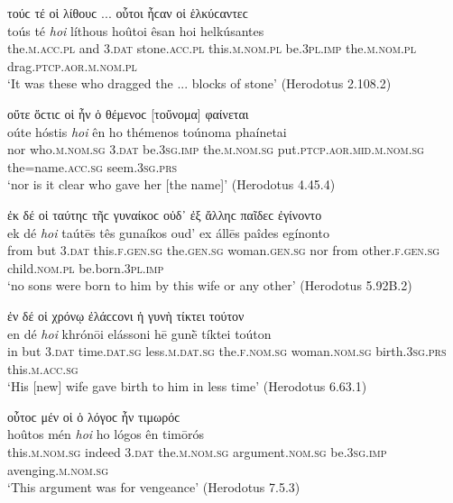 \begin{exe}
\ex τούϲ τέ {οἱ} λίθουϲ ... οὗτοι ἦϲαν οἱ ἑλκύϲαντεϲ\\
\gll toús té \emph{hoi} líthous hoûtoi êsan {hoi} helkúsantes\\
the.\textsc{m.acc.pl} and \textsc{3.dat} stone.\textsc{acc.pl} this.\textsc{m.nom.pl} be.\textsc{3pl.imp} the.\textsc{m.nom.pl} drag.\textsc{ptcp.aor.m.nom.pl}\\
\trans `It was these who dragged the ... blocks of stone' (Herodotus 2.108.2)
\label{oi6}
\end{exe}

\begin{exe}
\ex οὔτε ὅϲτιϲ {οἱ} ἦν ὁ {θέμενοϲ} {[}τοὔνομα{]} φαίνεται\\
\gll oúte hóstis \emph{hoi} ên ho {thémenos} toúnoma phaínetai\\
nor who.\textsc{m.nom.sg} \textsc{3.dat} be.\textsc{3sg.imp} the.\textsc{m.nom.sg} put.\textsc{ptcp.aor.mid.m.nom.sg} the=name.\textsc{acc.sg} seem.\textsc{3sg.prs}\\
\trans `nor is it clear who gave her {[}the name{]}' (Herodotus 4.45.4)
\label{oi7}
\end{exe}

\begin{exe}
\ex ἐκ δέ {οἱ} ταύτηϲ τῆϲ γυναίκοϲ οὐδ᾽ ἐξ ἄλληϲ παῖδεϲ {ἐγίνοντο}\\
\gll ek dé \emph{hoi} taútēs tês gunaíkos oud' ex állēs paîdes {egínonto}\\
from but \textsc{3.dat} this.\textsc{f.gen.sg} the.\textsc{gen.sg} woman.\textsc{gen.sg} nor from other.\textsc{f.gen.sg} child.\textsc{nom.pl} be.born.\textsc{3pl.imp}\\
\trans `no sons were born to him by this wife or any other' (Herodotus 5.92B.2)
\label{oi8}
\end{exe}

\begin{exe}
\ex ἐν δέ {οἱ} χρόνῳ ἐλάϲϲονι ἡ γυνὴ {τίκτει} τούτον\\
\gll en dé \emph{hoi} khrónōi elássoni hē gunḕ tíktei toúton\\
in but \textsc{3.dat} time.\textsc{dat.sg} less.\textsc{m.dat.sg} the.\textsc{f.nom.sg} woman.\textsc{nom.sg} birth.\textsc{3sg.prs} this.\textsc{m.acc.sg}\\
\trans `His [new] wife gave birth to him in less time' (Herodotus 6.63.1)
\label{oi9}
\end{exe}

\begin{exe}
\ex οὗτοϲ μέν {οἱ} ὁ λόγοϲ ἦν {τιμωρόϲ}\\
\gll hoûtos mén \emph{hoi} ho lógos ên timōrós\\
this.\textsc{m.nom.sg} indeed \textsc{3.dat} the.\textsc{m.nom.sg} argument.\textsc{nom.sg} be.\textsc{3sg.imp} avenging.\textsc{m.nom.sg}\\
\trans `This argument was for vengeance' (Herodotus 7.5.3)
\label{oi10}
\end{exe}

